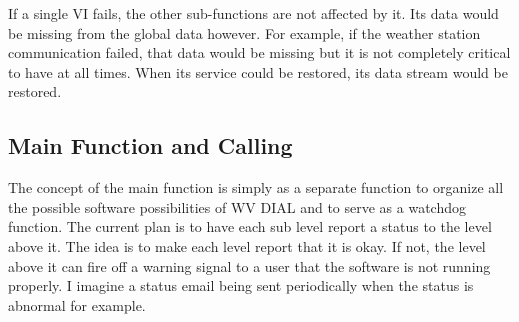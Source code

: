 If a single VI fails, the other sub-functions are not affected by it. Its data would be missing from the global data however. For example, if the weather station communication failed, that data would be missing but it is not completely critical to have at all times. When its service could be restored, its data stream would be restored. 

\subsection{Main Function and Calling}

The concept of the main function is simply as a separate function to organize all the possible software possibilities of WV DIAL and to serve as a watchdog function. The current plan is to have each sub level report a status to the level above it. The idea is to make each level report that it is okay. If not, the level above it can fire off a warning signal to a user that the software is not running properly. I imagine a status email being sent periodically when the status is abnormal for example. 


\newpage 
